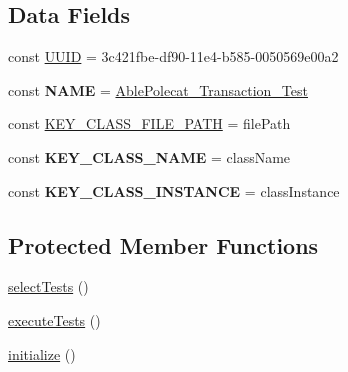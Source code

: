 \subsection*{Data Fields}
\begin{DoxyCompactItemize}
\item 
const \hyperlink{class_able_polecat___transaction___test_a74b892c8c0b86bf9d04c5819898c51e7}{U\+U\+I\+D} = \textquotesingle{}3c421fbe-\/df90-\/11e4-\/b585-\/0050569e00a2\textquotesingle{}
\item 
\hypertarget{class_able_polecat___transaction___test_a244352f035b82b20b0efa506167fd862}{}const {\bfseries N\+A\+M\+E} = \textquotesingle{}\hyperlink{class_able_polecat___transaction___test}{Able\+Polecat\+\_\+\+Transaction\+\_\+\+Test}\textquotesingle{}\label{class_able_polecat___transaction___test_a244352f035b82b20b0efa506167fd862}

\item 
const \hyperlink{class_able_polecat___transaction___test_afae1281886344b82b7b28e7d56179f40}{K\+E\+Y\+\_\+\+C\+L\+A\+S\+S\+\_\+\+F\+I\+L\+E\+\_\+\+P\+A\+T\+H} = \textquotesingle{}file\+Path\textquotesingle{}
\item 
\hypertarget{class_able_polecat___transaction___test_a6227902f7bed9fcaa0f37b9f0a677408}{}const {\bfseries K\+E\+Y\+\_\+\+C\+L\+A\+S\+S\+\_\+\+N\+A\+M\+E} = \textquotesingle{}class\+Name\textquotesingle{}\label{class_able_polecat___transaction___test_a6227902f7bed9fcaa0f37b9f0a677408}

\item 
\hypertarget{class_able_polecat___transaction___test_a16dfb3e8a3998d6e38fc43276f964aa4}{}const {\bfseries K\+E\+Y\+\_\+\+C\+L\+A\+S\+S\+\_\+\+I\+N\+S\+T\+A\+N\+C\+E} = \textquotesingle{}class\+Instance\textquotesingle{}\label{class_able_polecat___transaction___test_a16dfb3e8a3998d6e38fc43276f964aa4}

\end{DoxyCompactItemize}
\subsection*{Protected Member Functions}
\begin{DoxyCompactItemize}
\item 
\hyperlink{class_able_polecat___transaction___test_ab2e7ec82a708cb1123179c1cfffbde61}{select\+Tests} ()
\item 
\hyperlink{class_able_polecat___transaction___test_a3dd468c0420beac5c29ad9f55529943a}{execute\+Tests} ()
\item 
\hyperlink{class_able_polecat___transaction___test_a91098fa7d1917ce4833f284bbef12627}{initialize} ()
\end{DoxyCompactItemize}
